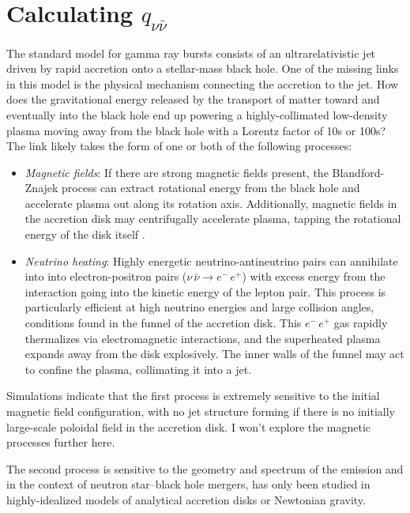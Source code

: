 \section{Calculating $q_{\nu \bar{\nu}}$}
\label{sec:q_algorithm}
The standard model for gamma ray bursts consists of an ultrarelativistic jet
driven by rapid accretion onto a stellar-mass black hole. One of the missing
links in this model is the physical mechanism connecting the accretion to the
jet. How does the gravitational energy released by the transport of matter
toward and eventually into the black hole end up powering a highly-collimated
low-density plasma moving away from the black hole with a Lorentz factor of
10s or 100s? The link likely takes the form of one or both of the following
processes:
\begin{itemize}
  \item \emph{Magnetic fields}: If there are strong magnetic fields present, the
    Blandford-Znajek process \citep{blan1977-blandford_znajek} can extract
    rotational energy from the black hole and accelerate plasma out along its
    rotation axis. Additionally, magnetic fields in the accretion disk may
    centrifugally accelerate plasma, tapping the rotational energy of the
    disk itself \citep{blan1982-blandford_payne}.
  \item \emph{Neutrino heating}: Highly energetic neutrino-antineutrino pairs
    can annihilate into into electron-positron pairs
    ($\nu \, \bar{\nu} \rightarrow e^{-} \, e^{+}$)
    with excess energy from the interaction going into the kinetic energy of the
    lepton pair.
    This process is particularly efficient at high neutrino energies and large
    collision angles, conditions found in the funnel of the accretion disk.
    This $e^{-}\,e^{+}$ gas rapidly thermalizes via electromagnetic interactions,
    and the superheated plasma expands away from the disk explosively. The inner
    walls of the funnel may act to confine the plasma, collimating it into a jet.
\end{itemize}

Simulations indicate that the first process is extremely sensitive to the
initial magnetic field configuration, with no jet structure forming if there is
no initially large-scale poloidal field in the accretion disk.
I won't explore the magnetic processes further here.

The second process is sensitive to the geometry and spectrum of the emission
and in the context of neutron star--black hole mergers, has only been studied
in highly-idealized models of analytical accretion disks or Newtonian gravity.

